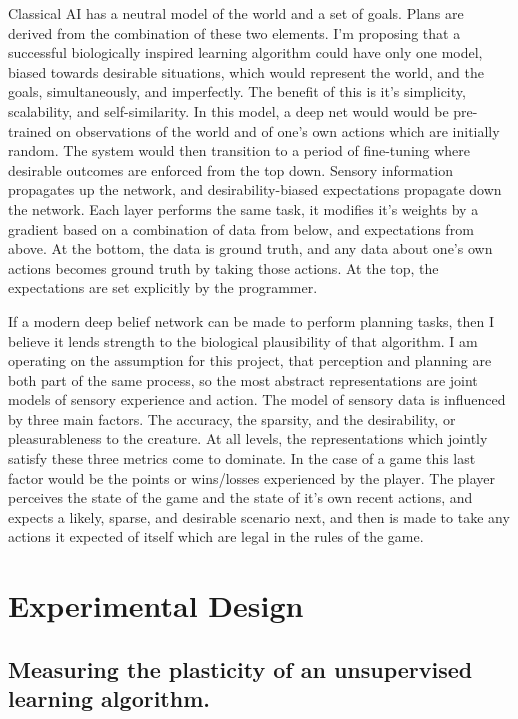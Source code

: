 \documentclass[12pt]{article}
\begin{document}
Classical AI has a neutral model of the world and a set of goals. Plans are derived from the combination of these two elements. I'm proposing that a successful biologically inspired learning algorithm could have only one model, biased towards desirable situations, which would represent the world, and the goals, simultaneously, and imperfectly. The benefit of this is it's simplicity, scalability, and self-similarity. In this model, a deep net would would be pre-trained on observations of the world and of one's own actions which are initially random. The system would then transition to a period of fine-tuning where desirable outcomes are enforced from the top down. Sensory information propagates up the network, and desirability-biased expectations propagate down the network. Each layer performs the same task, it modifies it's weights by a gradient based on a combination of data from below, and expectations from above. At the bottom, the data is ground truth, and any data about one's own actions becomes ground truth by taking those actions. At the top, the expectations are set explicitly by the programmer. 

If a modern deep belief network can be made to perform planning tasks, then I believe it lends strength to the biological plausibility of that algorithm. I am operating on the assumption for this project, that perception and planning are both part of the same process, so the most abstract representations are joint models of sensory experience and action. The model of sensory data is influenced by three main factors. The accuracy, the sparsity, and the desirability, or pleasurableness to the creature. At all levels, the representations which jointly satisfy these three metrics come to dominate. In the case of a game this last factor would be the points or wins/losses experienced by the player. The player perceives the state of the game and the state of it's own recent actions, and expects a likely, sparse, and desirable scenario next, and then is made to take any actions it expected of itself which are legal in the rules of the game. 

\section{Experimental Design}

	\subsection{Measuring the plasticity of an unsupervised learning algorithm.}
	
\end{document}
